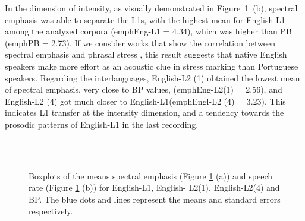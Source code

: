 In the dimension of intensity, as visually demonstrated in Figure~\ref{leo-fig04}~(b), spectral
emphasis was able to separate the L1s, with the highest mean for English-L1
among the analyzed corpora (emphEng-L1 = 4.34), which was higher than PB
(emphPB = 2.73). If we consider works that show the correlation between
spectral emphasis and phrasal stress \citep{heldner2001}, %
this result suggests that
native English speakers make more effort as an acoustic clue in stress marking
than Portuguese speakers. Regarding the interlanguages, English-L2 (1) obtained
the lowest mean of spectral emphasis, very close to BP values, (emphEng-L2(1) =
2.56), and English-L2 (4) got much closer to English-L1(emphEngl-L2 (4) =
3.23). This indicates L1 transfer at the intensity dimension, and a tendency
towards the prosodic patterns of English-L1 in the last recording.

\begin{figure}[h]
\centering
{}\\
\\
\caption{Boxplots of the means spectral emphasis (Figure \ref{leo-fig04} (a)) and speech rate
(Figure \ref{leo-fig04} (b)) for English-L1, English- L2(1), English-L2(4) and BP. The blue
dots and lines represent the means and standard errors respectively.}
\label{leo-fig04}
\end{figure}

